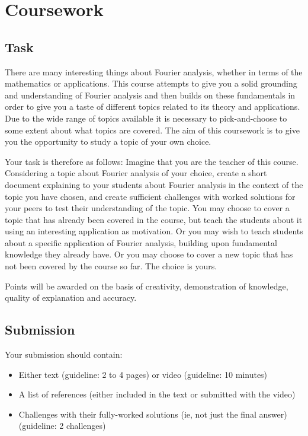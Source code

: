 \newpage
\section{Coursework}
\subsection{Task}
There are many interesting things about Fourier analysis, whether in terms of the mathematics or applications.
This course attempts to give you a solid grounding and understanding of Fourier analysis and then builds on these fundamentals in order to give you a taste of different topics related to its theory and applications.
Due to the wide range of topics available it is necessary to pick-and-choose to some extent about what topics are covered.
The aim of this coursework is to give you the opportunity to study a topic of your own choice.

Your task is therefore as follows:
Imagine that you are the teacher of this course.
Considering a topic about Fourier analysis of your choice, create a short document explaining to your students about Fourier analysis in the context of the topic you have chosen, and create sufficient challenges with worked solutions for your peers to test their understanding of the topic.
You may choose to cover a topic that has already been covered in the course, but teach the students about it using an interesting application as motivation. Or you may wish to teach students about a specific application of Fourier analysis, building upon fundamental knowledge they already have. Or you may choose to cover a new topic that has not been covered by the course so far. The choice is yours.

Points will be awarded on the basis of creativity, demonstration of knowledge, quality of explanation and accuracy.

\subsection{Submission}
Your submission should contain:
\begin{itemize}
    \item Either text (guideline: 2 to 4 pages) or video (guideline: 10 minutes)
    \item A list of references (either included in the text or submitted with the video)
    \item Challenges with their fully-worked solutions (ie, not just the final answer) (guideline: 2 challenges)
\end{itemize}

